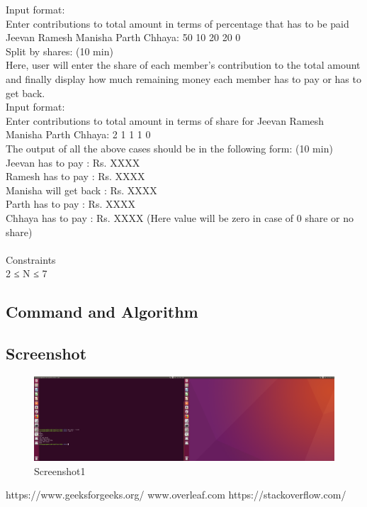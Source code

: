 \documentclass[12pt]{article}
\begin{document}
Input format:\\
Enter contributions to total amount in terms of percentage that has to be paid Jeevan Ramesh Manisha Parth Chhaya: 50 10 20 20 0\\
Split by shares:                                (10 min)\\
Here, user will enter the share of each member’s contribution to the total amount and finally display how much remaining money each member has to pay or has to get back. \\
Input format:\\
Enter contributions to total amount in terms of share for Jeevan Ramesh Manisha Parth Chhaya: 2 1 1 1 0\\

The output of all the above cases should be in the following form:            (10 min)\\
Jeevan has to pay    : Rs. XXXX\\
Ramesh has to pay    : Rs. XXXX\\
Manisha will get back    : Rs. XXXX\\
Parth has to pay     : Rs. XXXX\\
Chhaya has to pay    : Rs. XXXX (Here value will be zero in case of 0 share or no share)\\
\\
Constraints\\
2 ≤ N ≤ 7\\




\subsection{Command and Algorithm}





\subsection{Screenshot}
\begin{figure}[h!]
\begin{center}
\includegraphics[scale=0.12]{pa2.png}
\caption{Screenshot1}
\end{center}
\end{figure}











        



\newpage



\begin{thebibliography}{}
https://www.geeksforgeeks.org/ 
www.overleaf.com
https://stackoverflow.com/
\end{thebibliography}{}
\end{document}
